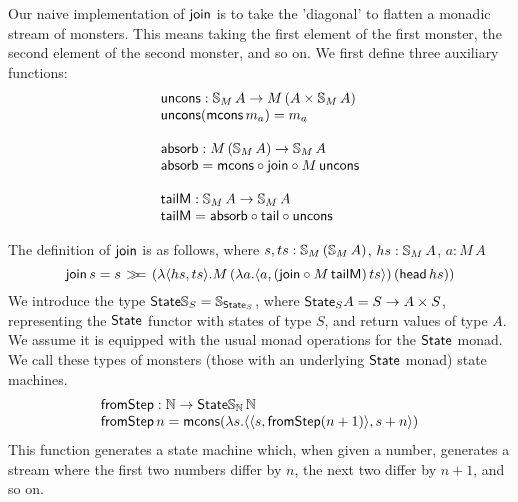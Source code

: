 Our naive implementation of $\mathsf{join}$ is to take the 'diagonal' to flatten a monadic stream of monsters. This means taking the first element of the first monster, the second element of the second monster, and so on. We first define three auxiliary functions:
$$
\begin{array}{l}
\mathsf{uncons} : \mathbb{S}_{M}\,A \rightarrow M\,(A \times \mathbb{S}_{M}\,A)\\
\mathsf{uncons} (\mathsf{mcons}\, m_a) = m_a \\
\,\\
\mathsf{absorb} : M\,(\mathbb{S}_{M}\,A) \rightarrow \mathbb{S}_{M}\,A \\
\mathsf{absorb} =  \mathsf{mcons} \circ \mathsf{join} \circ M\,\mathsf{uncons} \\
\,\\
\mathsf{tailM} : \mathbb{S}_{M}\,A \rightarrow \mathbb{S}_{M}\,A \\
\mathsf{tailM} = \mathsf{absorb} \circ \mathsf{tail} \circ \mathsf{uncons}
\end{array}
$$

The definition of $\mathsf{join}$ is as follows, where $s, ts : \mathbb{S}_{M}\,(\mathbb{S}_{M}\, A)$, 
$hs : \mathbb{S}_{M}\, A$, $a : M\, A$
$$
\mathsf{join}\, s = s \, \mathbin{\gg\!\!=} \,(\lambda \langle hs, ts \rangle . M\,(\lambda a . \langle a, (\mathsf{join} \circ M\,\mathsf{tailM})\, ts \rangle)\, (\mathsf{head}\, hs))
$$
We introduce the type $\mathsf{State}\mathbb{S}_{S} = \mathbb{S}_{\mathsf{State}_S}$, where $\mathsf{State}_S A = S \rightarrow A \times S$, representing the $\mathsf{State}$ functor with states of type $S$, and return values of type $A$. We assume it is equipped with the usual monad operations for the $\mathsf{State}$ monad. We call these types of monsters (those with an underlying $\mathsf{State}$ monad) state machines.
$$
\begin{array}{l}
\mathsf{fromStep} : \mathbb{N} \rightarrow \mathsf{State}\mathbb{S}_{\mathbb{N}}\,\mathbb{N} \\
\mathsf{fromStep}\, n = \mathsf{mcons} (\lambda s. \langle \langle s, \mathsf{fromStep} (n + 1) \rangle, s + n \rangle)
\end{array}
$$
This function generates a state machine which, when given a number, generates a stream where the first two numbers differ by $n$, the next two differ by $n + 1$, and so on.



